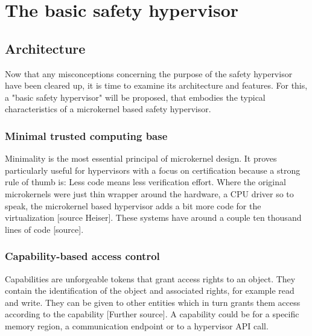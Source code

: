 
\chapter{The basic safety hypervisor} %

\label{Chapter2} %


\newcommand{\keyword}[1]{\textbf{#1}}
\newcommand{\tabhead}[1]{\textbf{#1}}
\newcommand{\code}[1]{\texttt{#1}}
\newcommand{\file}[1]{\texttt{\bfseries#1}}
\newcommand{\option}[1]{\texttt{\itshape#1}}


\section{Architecture}
Now that any misconceptions concerning the purpose of the safety hypervisor have been cleared up, it is time to examine its architecture and features. For this, a "basic safety hypervisor" will be proposed, that embodies the typical characteristics of a microkernel based safety hypervisor.

\subsection{Minimal trusted computing base}
Minimality is the most essential principal of microkernel design. It proves particularly useful for hypervisors with a focus on certification because a strong rule of thumb is: Less code means less verification effort. 
Where the original microkernels were just thin wrapper around the hardware, a \gls{CPU} driver so to speak, the microkernel based hypervisor adds a bit more code for the virtualization [source Heiser]. These systems have around a couple ten thousand lines of code [source].

\subsection{Capability-based access control}
Capabilities are unforgeable tokens that grant access rights to an object. They contain the identification of the object and associated rights, for example read and write.
They can be given to other entities which in turn grants them access according to the capability [Further source]. A capability could be for a specific memory region, a communication endpoint or to a hypervisor \gls{API} call.

